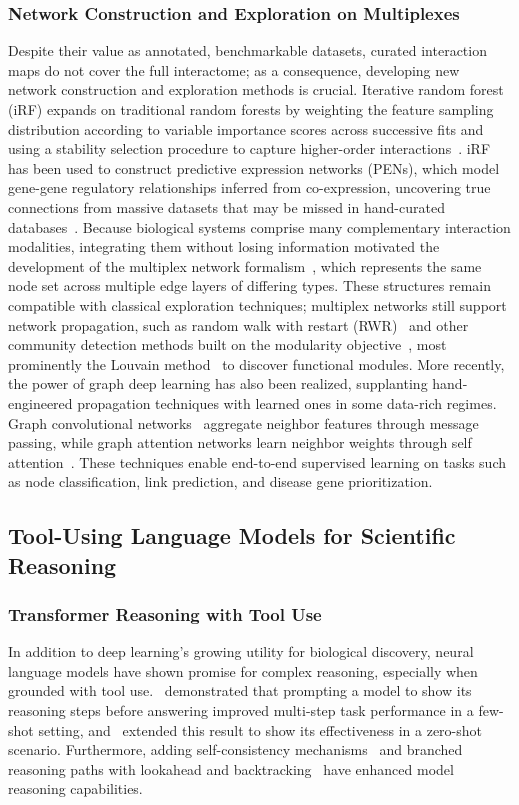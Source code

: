 \documentclass[thesis,letterpaper,12pt]{utthesis}
\begin{document}
\subsubsection{Network Construction and Exploration on Multiplexes}
Despite their value as annotated, benchmarkable datasets, curated interaction maps do not cover the full interactome; as a consequence, developing new network construction and exploration methods is crucial. Iterative random forest (iRF) expands on traditional random forests by weighting the feature sampling distribution according to variable importance scores across successive fits and using a stability selection procedure to capture higher-order interactions~\cite{basu2018iterative}. iRF has been used to construct predictive expression networks (PENs), which model gene-gene regulatory relationships inferred from co-expression, uncovering true connections from massive datasets that may be missed in hand-curated databases~\cite{cliff2019high, walker2022evaluating}. Because biological systems comprise many complementary interaction modalities, integrating them without losing information motivated the development of the multiplex network formalism~\cite{mucha2010community, de2013mathematical}, which represents the same node set across multiple edge layers of differing types. These structures remain compatible with classical exploration techniques; multiplex networks still support network propagation, such as random walk with restart (RWR)~\cite{kohler2008walking, cowen2017network} and other community detection methods built on the modularity objective~\cite{newman2004finding}, most prominently the Louvain method~\cite{blondel2008fast} to discover functional modules. More recently, the power of graph deep learning has also been realized, supplanting hand-engineered propagation techniques with learned ones in some data-rich regimes. Graph convolutional networks~\cite{kipf2016semi} aggregate neighbor features through message passing, while graph attention networks learn neighbor weights through self attention~\cite{velivckovic2017graph}. These techniques enable end-to-end supervised learning on tasks such as node classification, link prediction, and disease gene prioritization.

\subsection{Tool-Using Language Models for Scientific Reasoning}
\subsubsection{Transformer Reasoning with Tool Use}
In addition to deep learning's growing utility for biological discovery, neural language models have shown promise for complex reasoning, especially when grounded with tool use.~\cite{wei2022chain} demonstrated that prompting a model to show its reasoning steps before answering improved multi-step task performance in a few-shot setting, and~\cite{kojima2022large} extended this result to show its effectiveness in a zero-shot scenario. Furthermore, adding self-consistency mechanisms~\cite{wang2022self} and branched reasoning paths with lookahead and backtracking~\cite{yao2023tree} have enhanced model reasoning capabilities. 
\end{document}
